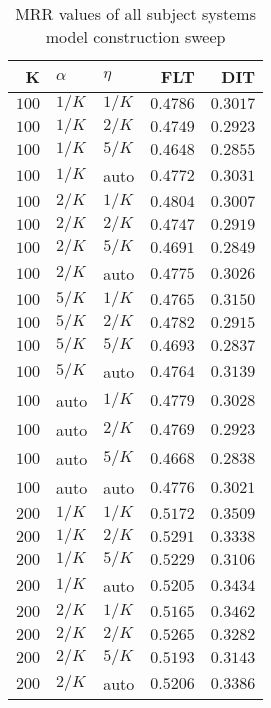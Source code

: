 
\begin{table}
\begin{spacing}{1.2}
\centering
\caption{MRR values of all subject systems model construction sweep}
\label{table:all_model_sweep}
\vspace{0.2em}
\parbox{.45\linewidth}{\centering \begin{tabular}{rll|rr}
\toprule
    K &  $\alpha$ &    $\eta$ &      FLT &      DIT \\
\midrule
$100$ &  $1/K$ &  $1/K$ & $0.4786$ & $0.3017$ \\
$100$ &  $1/K$ &  $2/K$ & $0.4749$ & $0.2923$ \\
$100$ &  $1/K$ &  $5/K$ & $0.4648$ & $0.2855$ \\
$100$ &  $1/K$ &   auto & $0.4772$ & $0.3031$ \\
$100$ &  $2/K$ &  $1/K$ & $0.4804$ & $0.3007$ \\
$100$ &  $2/K$ &  $2/K$ & $0.4747$ & $0.2919$ \\
$100$ &  $2/K$ &  $5/K$ & $0.4691$ & $0.2849$ \\
$100$ &  $2/K$ &   auto & $0.4775$ & $0.3026$ \\
$100$ &  $5/K$ &  $1/K$ & $0.4765$ & $0.3150$ \\
$100$ &  $5/K$ &  $2/K$ & $0.4782$ & $0.2915$ \\
$100$ &  $5/K$ &  $5/K$ & $0.4693$ & $0.2837$ \\
$100$ &  $5/K$ &   auto & $0.4764$ & $0.3139$ \\
$100$ &   auto &  $1/K$ & $0.4779$ & $0.3028$ \\
$100$ &   auto &  $2/K$ & $0.4769$ & $0.2923$ \\
$100$ &   auto &  $5/K$ & $0.4668$ & $0.2838$ \\
$100$ &   auto &   auto & $0.4776$ & $0.3021$ \\
$200$ &  $1/K$ &  $1/K$ & $0.5172$ & $0.3509$ \\
$200$ &  $1/K$ &  $2/K$ & $0.5291$ & $0.3338$ \\
$200$ &  $1/K$ &  $5/K$ & $0.5229$ & $0.3106$ \\
$200$ &  $1/K$ &   auto & $0.5205$ & $0.3434$ \\
$200$ &  $2/K$ &  $1/K$ & $0.5165$ & $0.3462$ \\
$200$ &  $2/K$ &  $2/K$ & $0.5265$ & $0.3282$ \\
$200$ &  $2/K$ &  $5/K$ & $0.5193$ & $0.3143$ \\
$200$ &  $2/K$ &   auto & $0.5206$ & $0.3386$ \\

\end{tabular}}
\end{spacing}
\end{table}
